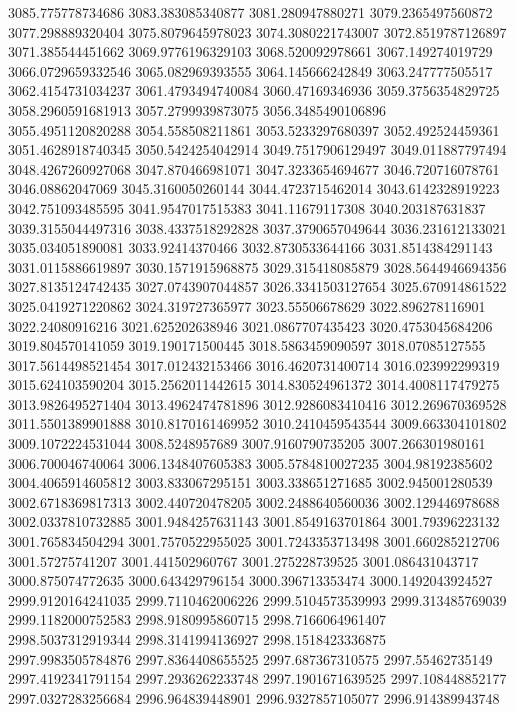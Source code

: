 \documentclass[10pt,letterpaper]{article}
\begin{document}
3085.775778734686
3083.383085340877
3081.280947880271
3079.2365497560872
3077.298889320404
3075.8079645978023
3074.3080221743007
3072.8519787126897
3071.385544451662
3069.9776196329103
3068.520092978661
3067.149274019729
3066.0729659332546
3065.082969393555
3064.145666242849
3063.247777505517
3062.4154731034237
3061.4793494740084
3060.47169346936
3059.3756354829725
3058.2960591681913
3057.2799939873075
3056.3485490106896
3055.4951120820288
3054.558508211861
3053.5233297680397
3052.492524459361
3051.4628918740345
3050.5424254042914
3049.7517906129497
3049.011887797494
3048.4267260927068
3047.870466981071
3047.3233654694677
3046.720716078761
3046.08862047069
3045.3160050260144
3044.4723715462014
3043.6142328919223
3042.751093485595
3041.9547017515383
3041.11679117308
3040.203187631837
3039.3155044497316
3038.4337518292828
3037.3790657049644
3036.231612133021
3035.034051890081
3033.92414370466
3032.8730533644166
3031.8514384291143
3031.0115886619897
3030.1571915968875
3029.315418085879
3028.5644946694356
3027.8135124742435
3027.0743907044857
3026.3341503127654
3025.670914861522
3025.0419271220862
3024.319727365977
3023.55506678629
3022.896278116901
3022.24080916216
3021.625202638946
3021.0867707435423
3020.4753045684206
3019.804570141059
3019.190171500445
3018.5863459090597
3018.07085127555
3017.5614498521454
3017.012432153466
3016.4620731400714
3016.023992299319
3015.624103590204
3015.2562011442615
3014.830524961372
3014.4008117479275
3013.9826495271404
3013.4962474781896
3012.9286083410416
3012.269670369528
3011.5501389901888
3010.8170161469952
3010.2410459543544
3009.663304101802
3009.1072224531044
3008.5248957689
3007.9160790735205
3007.266301980161
3006.700046740064
3006.1348407605383
3005.5784810027235
3004.98192385602
3004.4065914605812
3003.833067295151
3003.338651271685
3002.945001280539
3002.6718369817313
3002.440720478205
3002.2488640560036
3002.129446978688
3002.0337810732885
3001.9484257631143
3001.8549163701864
3001.79396223132
3001.765834504294
3001.7570522955025
3001.7243353713498
3001.660285212706
3001.57275741207
3001.441502960767
3001.275228739525
3001.086431043717
3000.875074772635
3000.643429796154
3000.396713353474
3000.1492043924527
2999.9120164241035
2999.7110462006226
2999.5104573539993
2999.313485769039
2999.1182000752583
2998.9180995860715
2998.7166064961407
2998.5037312919344
2998.3141994136927
2998.1518423336875
2997.9983505784876
2997.8364408655525
2997.687367310575
2997.55462735149
2997.4192341791154
2997.2936262233748
2997.1901671639525
2997.108448852177
2997.0327283256684
2996.964839448901
2996.9327857105077
2996.914389943748
\end{document}
